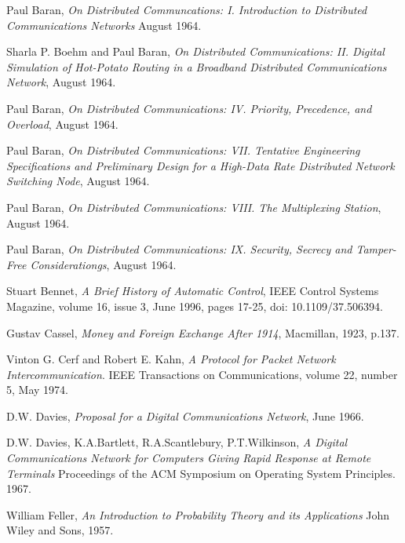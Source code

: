 \begin{thebibliography}{9}

    Paul Baran,
    \emph{On Distributed Communcations: I. Introduction to Distributed Communications Networks}
    August 1964.

    Sharla P. Boehm and Paul Baran,
    \emph{On Distributed Communications: II. Digital Simulation of Hot-Potato Routing in a Broadband
        Distributed Communications Network},
    August 1964.

    Paul Baran,
    \emph{On Distributed Communications: IV. Priority, Precedence, and Overload},
    August 1964.

    Paul Baran,
    \emph{On Distributed Communications: VII. Tentative Engineering Specifications and Preliminary
        Design for a High-Data Rate Distributed Network Switching Node},
    August 1964.

    Paul Baran,
    \emph{On Distributed Communications: VIII. The Multiplexing Station},
    August 1964.

    Paul Baran,
    \emph{On Distributed Communications: IX. Security, Secrecy and Tamper-Free Considerationgs},
    August 1964.

    Stuart Bennet,
    \emph{A Brief History of Automatic Control},
    IEEE Control Systems Magazine,
    volume 16,
    issue 3,
    June 1996,
    pages 17-25,
    doi: 10.1109/37.506394.

    Gustav Cassel,
    \emph{Money and Foreign Exchange After 1914},
    Macmillan,
    1923,
    p.137.

    Vinton G. Cerf and Robert E. Kahn,
    \emph{A Protocol for Packet Network Intercommunication}.
    IEEE Transactions on Communications,
    volume 22,
    number 5,
    May 1974.

    D.W. Davies,
    \emph{Proposal for a Digital Communications Network},
    June 1966.

    D.W. Davies, K.A.Bartlett, R.A.Scantlebury, P.T.Wilkinson,
    \emph{A Digital Communications Network for Computers Giving Rapid Response at Remote Terminals}
    Proceedings of the ACM Symposium on Operating System Principles.
    1967.

    William Feller,
    \emph{An Introduction to Probability Theory and its Applications}
    John Wiley and Sons,
    1957.


\end{thebibliography}
